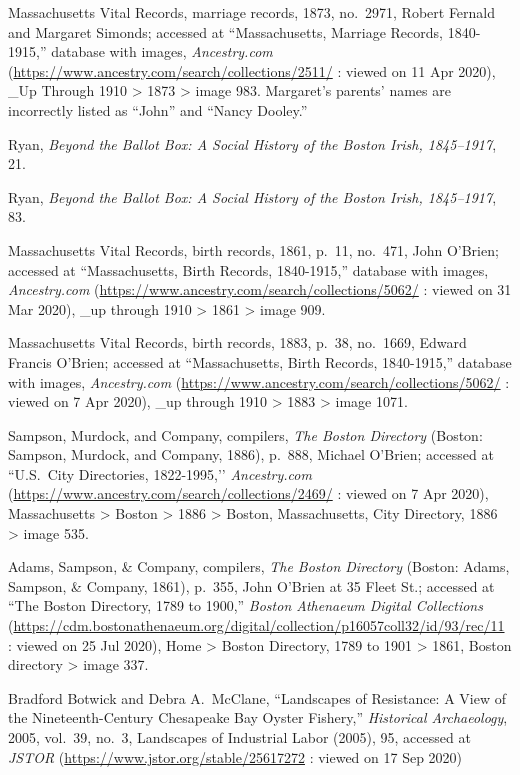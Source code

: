\begin{thebibliography}{999}
Massachusetts Vital Records, marriage records, 1873, no.\ 2971, Robert Fernald and Margaret Simonds; accessed at ``Massachusetts, Marriage Records, 1840-1915,'' database with images, \textit{Ancestry.com} (\url{https://www.ancestry.com/search/collections/2511/} : viewed on 11 Apr 2020), \_Up Through 1910 > 1873 > image 983. Margaret's parents' names are incorrectly listed as ``John'' and ``Nancy Dooley.''

Ryan, \textit{Beyond the Ballot Box: A Social History of the Boston Irish, 1845--1917}, 21.

Ryan, \textit{Beyond the Ballot Box: A Social History of the Boston Irish, 1845--1917}, 83.

Massachusetts Vital Records, birth records, 1861, p.\ 11, no.\ 471, John O'Brien; accessed at ``Massachusetts, Birth Records, 1840-1915,'' database with images, \textit{Ancestry.com} (\url{https://www.ancestry.com/search/collections/5062/} : viewed on 31 Mar 2020), \_up through 1910 > 1861 > image 909.

Massachusetts Vital Records, birth records, 1883, p.\ 38, no.\ 1669, Edward Francis O'Brien; accessed at ``Massachusetts, Birth Records, 1840-1915,'' database with images, \textit{Ancestry.com} (\url{https://www.ancestry.com/search/collections/5062/} : viewed on 7 Apr 2020), \_up through 1910 > 1883 > image 1071.

Sampson, Murdock, and Company, compilers, \textit{The Boston Directory} (Boston: Sampson, Murdock, and Company, 1886), p.\ 888, Michael O'Brien; accessed at ``U.S.\ City Directories, 1822-1995,’’ \textit{Ancestry.com} (\url{https://www.ancestry.com/search/collections/2469/} : viewed on 7 Apr 2020), Massachusetts > Boston > 1886 > Boston, Massachusetts, City Directory, 1886 > image 535.

Adams, Sampson, \& Company, compilers, \textit{The Boston Directory} (Boston: Adams, Sampson, \& Company, 1861), p.\ 355, John O'Brien at 35 Fleet St.; accessed at ``The Boston Directory, 1789 to 1900,'' \textit{Boston Athenaeum Digital Collections} (\url{https://cdm.bostonathenaeum.org/digital/collection/p16057coll32/id/93/rec/11} : viewed on 25 Jul 2020), Home > Boston Directory, 1789 to 1901 > 1861, Boston directory > image 337.

Bradford Botwick and Debra A.\ McClane, ``Landscapes of Resistance: A View of the Nineteenth-Century Chesapeake Bay Oyster Fishery,''  \textit{Historical Archaeology}, 2005, vol.\ 39, no.\ 3, Landscapes of Industrial Labor (2005), 95, accessed at \textit{JSTOR} (\url{https://www.jstor.org/stable/25617272} : viewed on 17 Sep 2020)


\end{thebibliography}
